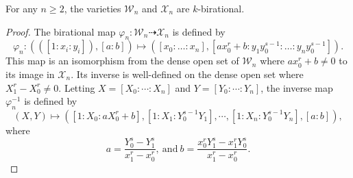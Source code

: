 \documentclass[10pt,a4paper]{amsart}
\newcommand{\Wc}{\mathcal{W}}
\newcommand{\Xc}{\mathcal{X}}
\begin{document}
\begin{thm}
	\label{thm2}
	For any $n \geq 2$, the varieties $\Wc_n$ and $\Xc_n$ are $k$-birational.
\end{thm}

\begin{proof}
	The birational map $\varphi_n: \Wc_n \dashrightarrow \Xc_n$ is defined by
	\[ \varphi_n: (([1:x_i:y_i]), [a:b]) \mapsto ([x_0:\dots:x_n], [ax_0^r+b : y_1 y_0^{s-1} : \dots : y_n y_0^{s-1}]). \]
	This map is an isomorphism from the dense open set of $\Wc_n$ where $ax_0^r+b \neq 0$ to its image in $\Xc_n$. Its inverse is well-defined on the dense open set where $X_1^r - X_0^r \neq 0$.
	Letting $X= [ X_0: \cdots: X_n]$ and $Y=[ Y_0 : 
	\cdots : Y_n]$, the inverse map $\varphi_n^{-1}$  is defined by
	$$ \left( X, Y \right) \mapsto 
	\left(  [1:X_0: a X_0^r+b], [1: X_1: Y_0^{s-1} Y_1], \cdots, [1: X_n: Y_0^{s-1} Y_n], [ a: b ]\right),$$ 
	where  
	\begin{equation*} 
		a=\frac {Y_0^s-Y_1^s}{x_1^r-x_0^r}, \  \text{and} \ b= \frac {x_0^r Y_1^s -x_1^r Y_0^s}{x_1^r-x_0^r}.
	\end{equation*}
	
\end{proof}
\end{document}
